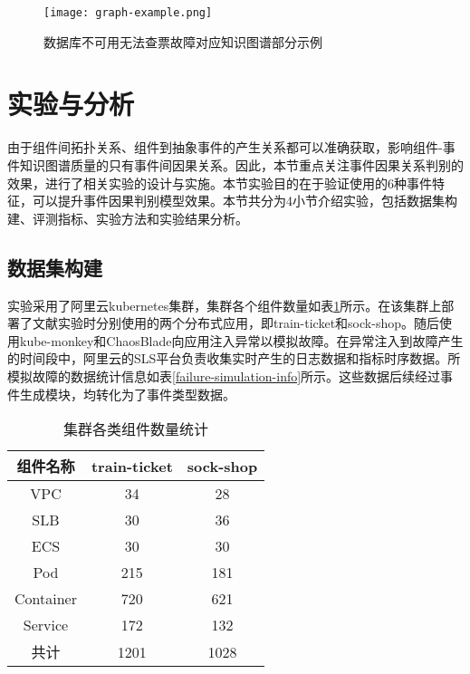 \begin{figure}[htbp]
    \centering
    \texttt{[image: graph-example.png]}
    \caption{数据库不可用无法查票故障对应知识图谱部分示例\label{graph-example}}
\end{figure}

\section{实验与分析}\label{event-cause-classidier-experiment}
由于组件间拓扑关系、组件到抽象事件的产生关系都可以准确获取，影响组件-事件知识图谱质量的只有事件间因果关系。因此，本节重点关注事件因果关系判别的效果，进行了相关实验的设计与实施。本节实验目的在于验证使用的6种事件特征，可以提升事件因果判别模型效果。本节共分为4小节介绍实验，包括数据集构建、评测指标、实验方法和实验结果分析。
\subsection{数据集构建}
实验采用了阿里云kubernetes集群，集群各个组件数量如表\ref{component-num}所示。在该集群上部署了文献\parencite{zhou2018poster,rahman2019predicting}实验时分别使用的两个分布式应用，即train-ticket和sock-shop。随后使用kube-monkey和ChaosBlade向应用注入异常以模拟故障。在异常注入到故障产生的时间段中，阿里云的SLS平台负责收集实时产生的日志数据和指标时序数据。所模拟故障的数据统计信息如表\ref{failure-simulation-info}所示。这些数据后续经过事件生成模块，均转化为了事件类型数据。
\begin{table}[htbp]
    \caption{集群各类组件数量统计}
    \label{component-num}
    \centering
    \begin{tabular}{ccc}
    \toprule[1.5pt]
    组件名称      & train-ticket & sock-shop        \\ \midrule[1.5pt]
    VPC       & 34           & 28 \\
    SLB       & 30           & 36 \\
    ECS       & 30           & 30 \\
    Pod       & 215          & 181 \\
    Container & 720          & 621 \\
    Service   & 172          & 132 \\ \midrule[1pt]
    共计   & 1201          & 1028 \\ \bottomrule[1.5pt]
    \end{tabular}
\end{table}

